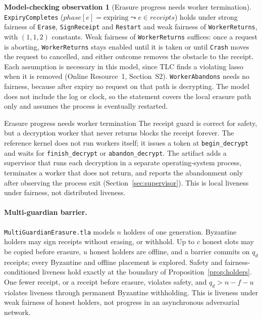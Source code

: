 \documentclass[pdflatex,sn-mathphys-num]{sn-jnl}%
\theoremstyle{plain}
\theoremstyle{definition}
\newtheorem{observation}{Model-checking observation}
\newcommand{\code}[1]{\texttt{#1}}
\begin{document}
\begin{observation}[Erasure progress needs worker termination]\label{obs:liveness}
\code{ExpiryCompletes} ($\mathit{phase}[e]=\text{expiring}\leadsto e\in\mathit{receipts}$) holds under strong fairness of \code{Erase}, \code{SignReceipt} and \code{Restart} and weak fairness of \code{WorkerReturns}, with $(1,1,2)$ constants. Weak fairness of \code{WorkerReturns} suffices: once a request is aborting, \code{WorkerReturns} stays enabled until it is taken or until \code{Crash} moves the request to cancelled, and either outcome removes the obstacle to the receipt. Each assumption is necessary in this model, since TLC finds a violating lasso when it is removed (Online Resource~1, Section~S2). \code{WorkerAbandons} needs no fairness, because after expiry no request on that path is decrypting. The model does not include the log or clock, so the statement covers the local erasure path only and assumes the process is eventually restarted.
\end{observation}

\begin{warnbox}{Erasure progress needs worker termination}
The receipt guard is correct for safety, but a decryption worker that never returns blocks the receipt forever. The reference kernel does not run workers itself; it issues a token at \code{begin\_decrypt} and waits for \code{finish\_decrypt} or \code{abandon\_decrypt}. The artifact adds a supervisor that runs each decryption in a separate operating-system process, terminates a worker that does not return, and reports the abandonment only after observing the process exit (Section~\ref{sec:supervisor}). This is local liveness under fairness, not distributed liveness.
\end{warnbox}

\paragraph{Multi-guardian barrier.}
\code{MultiGuardianErasure.tla} models $n$ holders of one generation. Byzantine holders may sign receipts without erasing, or withhold. Up to $c$ honest slots may be copied before erasure, $u$ honest holders are offline, and a barrier commits on $q_d$ receipts; every Byzantine and offline placement is explored. Safety and fairness-conditioned liveness hold exactly at the boundary of Proposition~\ref{prop:holders}. One fewer receipt, or a receipt before erasure, violates safety, and $q_d>n-f-u$ violates liveness through permanent Byzantine withholding. This is liveness under weak fairness of honest holders, not progress in an asynchronous adversarial network.
\end{document}
